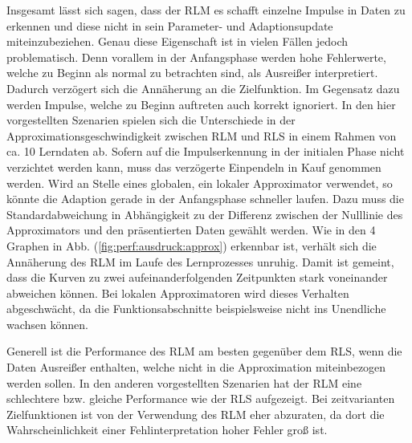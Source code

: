 \documentclass[a4paper, 12pt]{article}
\begin{document}
{Insgesamt lässt sich sagen, dass der RLM es schafft einzelne Impulse in Daten zu erkennen und diese nicht in sein Parameter- und Adaptionsupdate miteinzubeziehen. Genau diese Eigenschaft ist in vielen Fällen jedoch problematisch. Denn vorallem in der Anfangsphase werden hohe Fehlerwerte, welche zu Beginn als normal zu betrachten sind, als Ausreißer interpretiert. Dadurch verzögert sich die Annäherung an die Zielfunktion.
Im Gegensatz dazu werden Impulse, welche zu Beginn auftreten auch korrekt ignoriert.
In den hier vorgestellten Szenarien spielen sich die Unterschiede in der Approximationsgeschwindigkeit zwischen RLM und RLS  in einem Rahmen von ca. 10 Lerndaten ab. Sofern auf die Impulserkennung in der initialen Phase nicht verzichtet werden kann, muss das verzögerte Einpendeln in Kauf genommen werden.
Wird an Stelle eines globalen, ein lokaler Approximator verwendet, so könnte die Adaption gerade in der Anfangsphase schneller laufen. Dazu muss die Standardabweichung in Abhängigkeit zu der Differenz zwischen der Nulllinie des Approximators und den präsentierten Daten gewählt werden.
Wie in den 4 Graphen in Abb. (\ref{fig:perf:ausdruck:approx}) erkennbar ist, verhält sich die Annäherung des RLM im Laufe des Lernprozesses unruhig. Damit ist gemeint, dass die Kurven zu zwei aufeinanderfolgenden Zeitpunkten stark voneinander abweichen können.
Bei lokalen Approximatoren wird dieses Verhalten abgeschwächt, da die Funktionsabschnitte beispielsweise nicht ins Unendliche wachsen können.

Generell ist die Performance des RLM am besten gegenüber dem RLS, wenn die Daten Ausreißer enthalten, welche nicht in die Approximation miteinbezogen werden sollen. In den anderen vorgestellten Szenarien hat der RLM eine schlechtere bzw. gleiche Performance wie der RLS aufgezeigt.
Bei zeitvarianten Zielfunktionen ist von der Verwendung des RLM eher abzuraten, da dort die Wahrscheinlichkeit einer Fehlinterpretation hoher Fehler groß ist.

}
\end{document}

